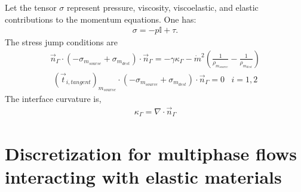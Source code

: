 \documentclass[]{article}
\newcommand{\EyeTen}{\mathbb{I}}
\begin{document}

Let the tensor $\sigma$ represent pressure, viscosity, viscoelastic, and
elastic contributions to the momentum equations.  One has:
\begin{eqnarray}
	\sigma=-p\EyeTen+\tau.
\end{eqnarray}
The stress jump conditions are
\begin{eqnarray}
\vec{n}_{\Gamma}\cdot (-\sigma_{m_{sourse}}+\sigma_{m_{dest}}) 
\cdot\vec{n}_{\Gamma}= -\gamma\kappa_{\Gamma}-
\dot{m}^{2}(
\frac{1}{\rho_{m_{source}}}-
\frac{1}{\rho_{m_{dest}}})
\end{eqnarray}
\begin{eqnarray}
	(\vec{t}_{i,tangent})_{m_{sourse}}\cdot
	(-\sigma_{m_{source}}+\sigma_{m_{dest}})
	\cdot\vec{n}_{\Gamma}=0 \hspace{10pt} i=1,2
\end{eqnarray}
The interface curvature is,
\begin{eqnarray}
	\kappa_{\Gamma}=\nabla\cdot\vec{n}_{\Gamma}
\end{eqnarray}

\section{Discretization for multiphase flows interacting with elastic materials}
\end{document}
